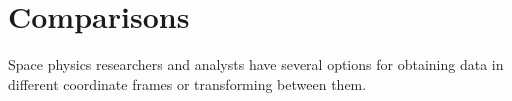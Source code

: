 \documentclass[draft]{agujournal2019}
\begin{document}
\begin{itemize}

     


\end{itemize}


\section{Comparisons}
\label{sect:comparisons}

Space physics researchers and analysts have several options for obtaining data in different coordinate frames or transforming between them.
\end{document}
